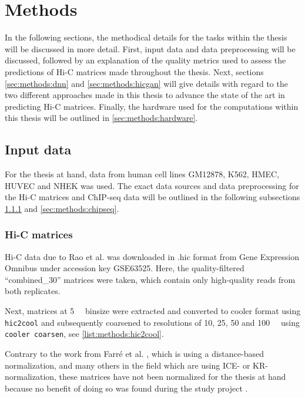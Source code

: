 \section{Methods}
In the following sections, the methodical details for the tasks within the thesis will be discussed in more detail.
First, input data and data preprocessing will be discussed, followed by an explanation of the quality metrics used to assess the predictions
of Hi-C matrices made throughout the thesis.
Next, sections \ref{sec:methods:dnn} and \ref{sec:methods:hicgan} will give details with regard to the two 
different approaches made in this thesis to advance the state of the art in predicting Hi-C matrices.
Finally, the hardware used for the computations within this thesis will be outlined in \cref{sec:methods:hardware}.

\subsection{Input data}
For the thesis at hand, data from human cell lines GM12878, K562, HMEC, HUVEC and NHEK was used.
The exact data sources and data preprocessing for the Hi-C matrices and ChIP-seq data 
will be outlined in the following subsections \ref{sec:methods:hicMatrices} and \ref{sec:methods:chipseq}.

\subsubsection{Hi-C matrices} \label{sec:methods:hicMatrices}
Hi-C data due to Rao et al. \cite{Rao2014} was downloaded 
in .hic format from Gene Expression Omnibus under accession key GSE63525.
Here, the quality-filtered ``combined\_30'' matrices were taken, which contain only high-quality reads from 
both replicates.

Next, matrices at \SI{5}{\kilo\bp} binsize were extracted and converted to cooler format using \texttt{hic2cool}
and subsequently coarsened to resolutions of 10, 25, 50 and \SI{100}{\kilo\bp} using \texttt{cooler coarsen},
see \cref{list:methods:hic2cool}.

Contrary to the work from Farr\'e et al. \cite{Farre2018a}, which is using a distance-based normalization,
and many others in the field which are using ICE- or KR-normalization, 
these matrices have not been normalized for the thesis at hand
because no benefit of doing so was found during the study project \cite{Krauth2020}.

